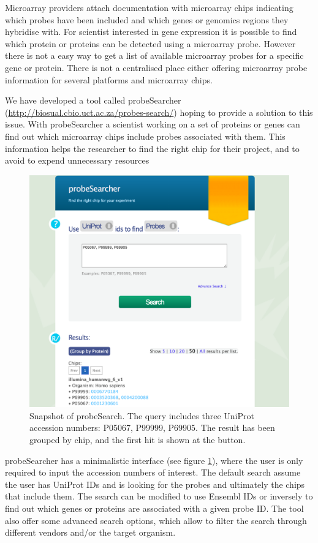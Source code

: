 Microarray providers attach documentation with microarray chips indicating which probes have been included and which genes or genomics regions they hybridise with. For scientist interested in gene expression it is possible to find which protein or proteins can be detected using a microarray probe. However there is not a easy way to get a list of available microarray probes for a specific gene or protein. There is not a centralised place either offering microarray probe information for several platforms and microarray chips.

We have developed a tool called probeSearcher (\url{http://biosual.cbio.uct.ac.za/probes-search/}) hoping to provide a solution to this issue. With probeSearcher a scientist working on a set of proteins or genes can find out which microarray chips include probes associated with them. This information helps the researcher to find the right chip for their project, and to avoid to expend unnecessary resources 

\begin{figure}  
\centering
\includegraphics[width=\textwidth]{figures/probesearch.png}
\caption[Snapshot of probeSearch.]{Snapshot of probeSearch. The query includes three UniProt accession numbers: P05067, P99999, P69905. The result has been grouped by chip, and the first hit is shown at the button.
\label{fig:probesearch}}
\end{figure}

 
probeSearcher has a minimalistic interface (see figure \ref{fig:probesearch}), where the user is only required to input the accession numbers of interest. The default search assume the user has UniProt IDs and is looking for the probes and ultimately the chips that include them. The search can be modified to use Ensembl IDs or inversely to find out which genes or proteins are associated with a given probe ID. The tool also offer some advanced search options, which allow to filter the search through different vendors and/or the target organism. 

